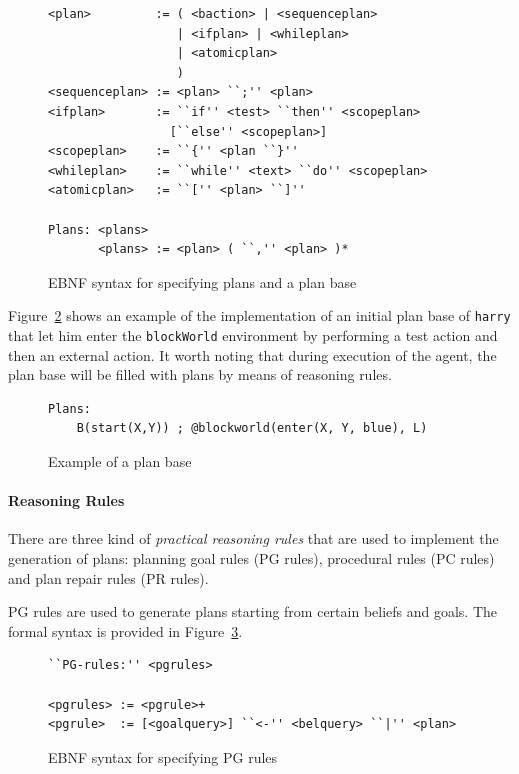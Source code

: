 \documentclass[a4paper]{article}
\begin{document}
\begin{figure}[htp]
\begin{verbatim}
<plan>         := ( <baction> | <sequenceplan>
                  | <ifplan> | <whileplan>
                  | <atomicplan>
                  )
<sequenceplan> := <plan> ``;'' <plan>
<ifplan>       := ``if'' <test> ``then'' <scopeplan>
                 [``else'' <scopeplan>]
<scopeplan>    := ``{'' <plan ``}''
<whileplan>    := ``while'' <text> ``do'' <scopeplan>
<atomicplan>   := ``['' <plan> ``]''

Plans: <plans>
       <plans> := <plan> ( ``,'' <plan> )*
\end{verbatim}
\caption{EBNF syntax for specifying plans and a plan base}
\label{fig:ebnf_plans}
\end{figure}

Figure~\ref{fig:ebnf_planbase} shows an example of the implementation of an initial plan base of \texttt{harry} that let him enter the \texttt{blockWorld} environment by performing a test action and then an external action. It worth noting that during execution of the agent, the plan base will be filled with plans by means of reasoning rules.
 
\begin{figure}[htp]
\begin{verbatim}
Plans:
	B(start(X,Y)) ; @blockworld(enter(X, Y, blue), L)
\end{verbatim}	
\caption{Example of a plan base}
\label{fig:ebnf_planbase}
\end{figure}

\paragraph{Reasoning Rules}

There are three kind of \emph{practical reasoning rules} that are used to implement the generation of plans: planning goal rules (PG rules), procedural rules (PC rules) and plan repair rules (PR rules). 

PG rules are used to generate plans starting from certain beliefs and goals. The formal syntax is provided in Figure~\ref{fig:ebnf_pgrules}.

\begin{figure}[htp]
\begin{verbatim}
``PG-rules:'' <pgrules>

<pgrules> := <pgrule>+
<pgrule>  := [<goalquery>] ``<-'' <belquery> ``|'' <plan>
\end{verbatim}
\caption{EBNF syntax for specifying PG rules}
\label{fig:ebnf_pgrules}
\end{figure}
\end{document}
